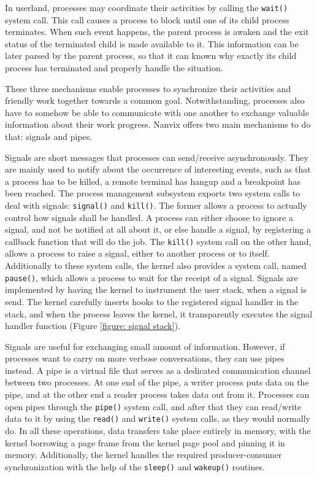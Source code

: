 	In userland, processes may coordinate their activities by
	calling the \texttt{wait()} system call. This call causes a
	process to block until one of its child process terminates. When
	such event happens, the parent process is awaken and the exit
	status of the terminated child is made available to it. This
	information can be later parsed by the parent process, so that
	it can known why exactly its child process has terminated and
	properly handle the situation.

	These three mechanisms enable processes to synchronize their
	activities and friendly work together towards a common goal.
	Notwithstanding, processes also have to somehow be able to
	communicate with one another to exchange valuable information
	about their work progress. Nanvix offers two main mechanisms to
	do that: signals and pipes.

	Signals are short messages that processes can send/receive
	asynchronously. They are mainly used to notify about the
	occurrence of interesting events, such as that a process has to
	be killed, a remote terminal has hangup and a breakpoint has
	been reached. The process management subsystem exports two
	system calls to deal with signals: \texttt{signal()} and
	\texttt{kill()}. The former allows a process to actually control
	how signals shall be handled. A process can either choose to
	ignore a signal, and not be notified at all about it, or else
	handle a signal, by registering a callback function that will do
	the job. The \texttt{kill()} system call on the other hand,
	allows a process to raise a signal, either to another process or
	to itself. Additionally to these system calls, the kernel also
	provides a system call, named \texttt{pause()}, which allows a
	process to wait for the receipt of a signal. Signals are
	implemented by having the kernel to instrument the user stack,
	when a signal is send. The kernel carefully inserts hooks to the
	registered signal handler in the stack, and when the process
	leaves the kernel, it transparently executes the signal handler
	function (Figure \ref{figure: signal stack}).

	Signals are useful for exchanging small amount of information.
	However, if processes want to carry on more verbose
	conversations, they can use pipes instead. A pipe is a virtual
	file that serves as a dedicated communication channel between
	two processes. At one end of the pipe, a writer process puts
	data on the pipe, and at the other end a reader process takes
	data out from it. Processes can open pipes through the
	\texttt{pipe()} system call, and after that they can read/write
	data to it by using the \texttt{read()} and \texttt{write()}
	system calls, as they would normally do. In all these
	operations, data transfers take place entirely in memory, with
	the kernel borrowing a page frame from the kernel page pool and
	pinning it in memory. Additionally, the kernel handles the
	required producer-consumer synchronization with the help of the
	\texttt{sleep()} and \texttt{wakeup()} routines.

